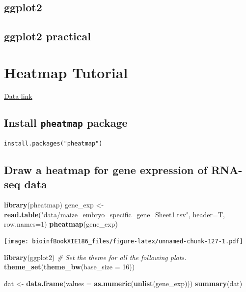 \documentclass[]{book}
\makeatletter
\newenvironment{Shaded}{\begin{snugshade}}{\end{snugshade}}
\newcommand{\CommentTok}[1]{\textcolor[rgb]{0.56,0.35,0.01}{\textit{#1}}}
\newcommand{\DataTypeTok}[1]{\textcolor[rgb]{0.13,0.29,0.53}{#1}}
\newcommand{\DecValTok}[1]{\textcolor[rgb]{0.00,0.00,0.81}{#1}}
\newcommand{\KeywordTok}[1]{\textcolor[rgb]{0.13,0.29,0.53}{\textbf{#1}}}
\newcommand{\NormalTok}[1]{#1}
\newcommand{\StringTok}[1]{\textcolor[rgb]{0.31,0.60,0.02}{#1}}
\newenvironment{kframe}{%
\medskip{}
\setlength{\fboxsep}{.8em}
 \def\at@end@of@kframe{}%
 \ifinner\ifhmode%
  \def\at@end@of@kframe{\end{minipage}}%
  \begin{minipage}{\columnwidth}%
 \fi\fi%
 \def\FrameCommand##1{\hskip\@totalleftmargin \hskip-\fboxsep
 \colorbox{shadecolor}{##1}\hskip-\fboxsep
     \hskip-\linewidth \hskip-\@totalleftmargin \hskip\columnwidth}%
 \MakeFramed {\advance\hsize-\width
   \@totalleftmargin\z@ \linewidth\hsize
   \@setminipage}}%
 {\par\unskip\endMakeFramed%
 \at@end@of@kframe}
\renewenvironment{Shaded}{\begin{kframe}}{\end{kframe}}
\makeatother
\begin{document}
\hypertarget{ggplot2-1}{%
\section{ggplot2}\label{ggplot2-1}}

\hypertarget{ggplot2-practical}{%
\section{ggplot2 practical}\label{ggplot2-practical}}

\hypertarget{heatmap-tutorial}{%
\chapter{Heatmap Tutorial}\label{heatmap-tutorial}}

\href{https://goo.gl/KLZ7N0}{Data link}

\hypertarget{install-pheatmap-package}{%
\section{\texorpdfstring{Install \texttt{pheatmap} package}{Install pheatmap package}}\label{install-pheatmap-package}}

\begin{verbatim}
install.packages("pheatmap")
\end{verbatim}

\hypertarget{draw-a-heatmap-for-gene-expression-of-rna-seq-data}{%
\section{Draw a heatmap for gene expression of RNA-seq data}\label{draw-a-heatmap-for-gene-expression-of-rna-seq-data}}

\begin{Shaded}
\begin{Highlighting}[]
\KeywordTok{library}\NormalTok{(pheatmap)}
\NormalTok{gene_exp <-}\StringTok{ }\KeywordTok{read.table}\NormalTok{(}\StringTok{"data/maize_embryo_specific_gene_Sheet1.tsv"}\NormalTok{, }\DataTypeTok{header=}\NormalTok{T, }\DataTypeTok{row.names=}\DecValTok{1}\NormalTok{)}
\KeywordTok{pheatmap}\NormalTok{(gene_exp)}
\end{Highlighting}
\end{Shaded}

\texttt{[image: bioinfBookXIE186\_files/figure-latex/unnamed-chunk-127-1.pdf]}

\begin{Shaded}
\begin{Highlighting}[]
\KeywordTok{library}\NormalTok{(ggplot2)}
\CommentTok{# Set the theme for all the following plots.}
\KeywordTok{theme_set}\NormalTok{(}\KeywordTok{theme_bw}\NormalTok{(}\DataTypeTok{base_size =} \DecValTok{16}\NormalTok{))}

\NormalTok{dat <-}\StringTok{ }\KeywordTok{data.frame}\NormalTok{(}\DataTypeTok{values =} \KeywordTok{as.numeric}\NormalTok{(}\KeywordTok{unlist}\NormalTok{(gene_exp)))}
\KeywordTok{summary}\NormalTok{(dat)}
\end{Highlighting}
\end{Shaded}
\end{document}
